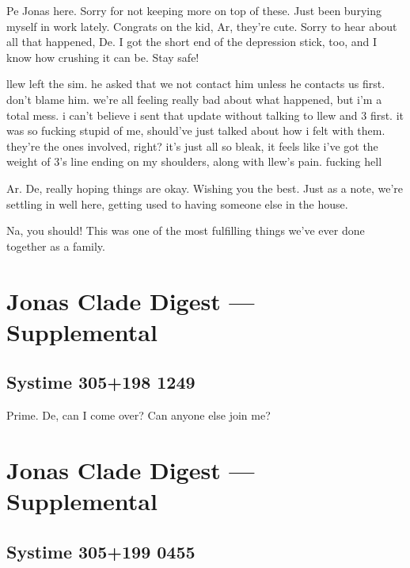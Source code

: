 Pe Jonas here. Sorry for not keeping more on top of these. Just been burying myself in work lately. Congrats on the kid, Ar, they're cute. Sorry to hear about all that happened, De. I got the short end of the depression stick, too, and I know how crushing it can be. Stay safe!

\secdiv{}

\noindent llew left the sim. he asked that we not contact him unless he contacts us first. don't blame him. we're all feeling really bad about what happened, but i'm a total mess. i can't believe i sent that update without talking to llew and 3 first. it was so fucking stupid of me, should've just talked about how i felt with them. they're the ones involved, right? it's just all so bleak, it feels like i've got the weight of 3's line ending on my shoulders, along with llew's pain. fucking hell

\secdiv{}

\noindent Ar. De, really hoping things are okay. Wishing you the best. Just as a note, we're settling in well here, getting used to having someone else in the house.

Na, you should! This was one of the most fulfilling things we've ever done together as a family.

\newpage
\hypertarget{jonas-clade-digest-supplemental-6}{%
\section*{Jonas Clade Digest --- Supplemental}\label{jonas-clade-digest-supplemental-6}}

\hypertarget{systime-305198-1249}{%
\subsection*{Systime 305+198 1249}\label{systime-305198-1249}}

Prime. De, can I come over? Can anyone else join me?

\newpage
\hypertarget{jonas-clade-digest-supplemental-7}{%
\section*{Jonas Clade Digest --- Supplemental}\label{jonas-clade-digest-supplemental-7}}

\hypertarget{systime-305199-0455}{%
\subsection*{Systime 305+199 0455}\label{systime-305199-0455}}

